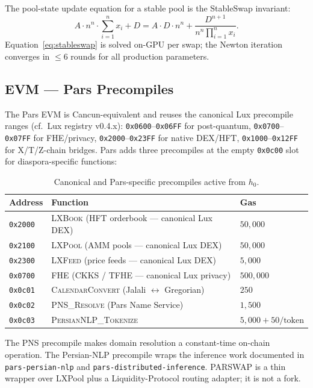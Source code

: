 \documentclass[11pt,a4paper]{article}
\begin{document}
The pool-state update equation for a stable pool is the StableSwap
invariant:
\begin{equation}
A \cdot n^n \cdot \sum_{i=1}^{n} x_i + D = A \cdot D \cdot n^n + \frac{D^{n+1}}{n^n \prod_{i=1}^{n} x_i}.
\label{eq:stableswap}
\end{equation}
Equation~\ref{eq:stableswap} is solved on-GPU per swap; the Newton
iteration converges in $\le 6$ rounds for all production parameters.

\subsection{EVM --- Pars Precompiles}

The Pars EVM is Cancun-equivalent and reuses the canonical Lux precompile
ranges (cf.\ Lux registry v0.4.x): \texttt{0x0600}--\texttt{0x06FF} for
post-quantum, \texttt{0x0700}--\texttt{0x07FF} for FHE/privacy,
\texttt{0x2000}--\texttt{0x23FF} for native DEX/HFT,
\texttt{0x1000}--\texttt{0x12FF} for X/T/Z-chain bridges. Pars adds three
precompiles at the empty \texttt{0x0c00} slot for diaspora-specific
functions:

\begin{table}[H]
\centering
\small
\begin{tabular}{lll}
\toprule
\textbf{Address} & \textbf{Function} & \textbf{Gas} \\
\midrule
\texttt{0x2000} & \textsc{LXBook} (HFT orderbook --- canonical Lux DEX) & $50{,}000$ \\
\texttt{0x2100} & \textsc{LXPool} (AMM pools --- canonical Lux DEX) & $50{,}000$ \\
\texttt{0x2300} & \textsc{LXFeed} (price feeds --- canonical Lux DEX) & $5{,}000$ \\
\texttt{0x0700} & \textsc{FHE} (CKKS / TFHE --- canonical Lux privacy) & $500{,}000$ \\
\texttt{0x0c01} & \textsc{CalendarConvert} (Jalali $\leftrightarrow$ Gregorian) & $250$ \\
\texttt{0x0c02} & \textsc{PNS\_Resolve} (Pars Name Service) & $1{,}500$ \\
\texttt{0x0c03} & \textsc{PersianNLP\_Tokenize} & $5{,}000 + 50/\text{token}$ \\
\bottomrule
\end{tabular}
\caption{Canonical and Pars-specific precompiles active from $h_0$.}
\end{table}

The PNS precompile makes domain resolution a constant-time on-chain
operation. The Persian-NLP precompile wraps the inference work
documented in \texttt{pars-persian-nlp} and \texttt{pars-distributed-inference}.
PARSWAP is a thin wrapper over LXPool plus a Liquidity-Protocol routing
adapter; it is not a fork.
\end{document}
